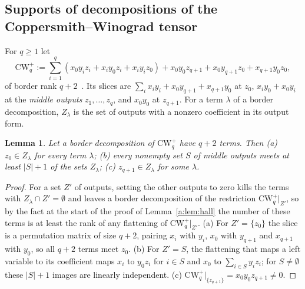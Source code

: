 \documentclass[11pt]{article}
\newtheorem{lemma}[theorem]{Lemma}
\theoremstyle{definition}
\theoremstyle{remark}
\begin{document}
\subsection{Supports of decompositions of the Coppersmith--Winograd tensor}\label{a:sec:cw}

For $q\ge1$ let
\[
\mathrm{CW}^+_q:=\sum_{i=1}^q(x_0y_iz_i+x_iy_0z_i+x_iy_iz_0)+x_0y_0z_{q+1}+x_0y_{q+1}z_0+x_{q+1}y_0z_0,
\]
of border rank $q+2$~\cite{CW90}. Its slices are $\sum_ix_iy_i+x_0y_{q+1}+x_{q+1}y_0$ at $z_0$, $x_iy_0+x_0y_i$ at the \emph{middle outputs} $z_1,\dots,z_q$, and $x_0y_0$ at $z_{q+1}$. For a term $\lambda$ of a border decomposition, $Z_\lambda$ is the set of outputs with a nonzero coefficient in its output form.

\begin{lemma}\label{a:lem:cwcover}
Let a border decomposition of $\mathrm{CW}^+_q$ have $q+2$ terms. Then (a) $z_0\in Z_\lambda$ for every term $\lambda$; (b) every nonempty set $S$ of middle outputs meets at least $|S|+1$ of the sets $Z_\lambda$; (c) $z_{q+1}\in Z_\lambda$ for some $\lambda$.
\end{lemma}

\begin{proof}
For a set $Z'$ of outputs, setting the other outputs to zero kills the terms with $Z_\lambda\cap Z'=\emptyset$ and leaves a border decomposition of the restriction $\mathrm{CW}^+_q|_{Z'}$, so by the fact at the start of the proof of Lemma~\ref{a:lem:hall} the number of these terms is at least the rank of any flattening of $\mathrm{CW}^+_q|_{Z'}$. (a) For $Z'=\{z_0\}$ the slice is a permutation matrix of size $q+2$, pairing $x_i$ with $y_i$, $x_0$ with $y_{q+1}$ and $x_{q+1}$ with $y_0$, so all $q+2$ terms meet $z_0$. (b) For $Z'=S$, the flattening that maps a left variable to its coefficient maps $x_i$ to $y_0z_i$ for $i\in S$ and $x_0$ to $\sum_{i\in S}y_iz_i$; for $S\ne\emptyset$ these $|S|+1$ images are linearly independent. (c) $\mathrm{CW}^+_q|_{\{z_{q+1}\}}=x_0y_0z_{q+1}\ne0$.
\end{proof}
\end{document}
